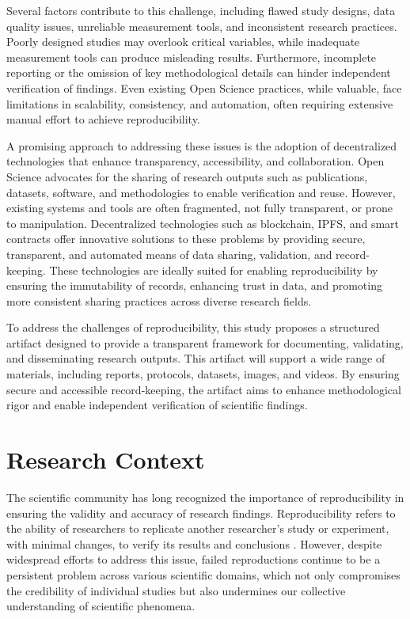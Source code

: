 \documentclass{article}
\begin{document}
Several factors contribute to this challenge, including flawed study designs, data quality issues, unreliable measurement tools, and inconsistent research practices. Poorly designed studies may overlook critical variables, while inadequate measurement tools can produce misleading results. Furthermore, incomplete reporting or the omission of key methodological details can hinder independent verification of findings. Even existing Open Science practices, while valuable, face limitations in scalability, consistency, and automation, often requiring extensive manual effort to achieve reproducibility.

A promising approach to addressing these issues is the adoption of decentralized technologies that enhance transparency, accessibility, and collaboration. Open Science advocates for the sharing of research outputs such as publications, datasets, software, and methodologies to enable verification and reuse. However, existing systems and tools are often fragmented, not fully transparent, or prone to manipulation. Decentralized technologies such as blockchain, IPFS, and smart contracts offer innovative solutions to these problems by providing secure, transparent, and automated means of data sharing, validation, and record-keeping. These technologies are ideally suited for enabling reproducibility by ensuring the immutability of records, enhancing trust in data, and promoting more consistent sharing practices across diverse research fields.

To address the challenges of reproducibility, this study proposes a structured artifact designed to provide a transparent framework for documenting, validating, and disseminating research outputs. This artifact will support a wide range of materials, including reports, protocols, datasets, images, and videos. By ensuring secure and accessible record-keeping, the artifact aims to enhance methodological rigor and enable independent verification of scientific findings.


\section{Research Context}

The scientific community has long recognized the importance of reproducibility in ensuring the validity and accuracy of research findings. Reproducibility refers to the ability of researchers to replicate another researcher's study or experiment, with minimal changes, to verify its results and conclusions \cite{NSF2019}. However, despite widespread efforts to address this issue, failed reproductions continue to be a persistent problem across various scientific domains, which not only compromises the credibility of individual studies but also undermines our collective understanding of scientific phenomena.
\end{document}
